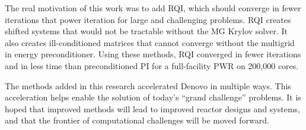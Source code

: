 The real motivation of this work was to add RQI, which should converge in fewer iterations that power iteration for large and challenging problems. RQI creates shifted systems that would not be tractable without the MG Krylov solver. It also creates ill-conditioned matrices that cannot converge without the multigrid in energy preconditioner. Using these methods, RQI converged in fewer iterations and in less time than preconditioned PI for a full-facility PWR on 200,000 cores. 

The methods added in this research accelerated Denovo in multiple ways. This acceleration helps enable the solution of today's ``grand challenge'' problems. It is hoped that improved methods will lead to improved reactor designs and systems, and that the frontier of computational challenges will be moved forward.  


\separatorpage{}
